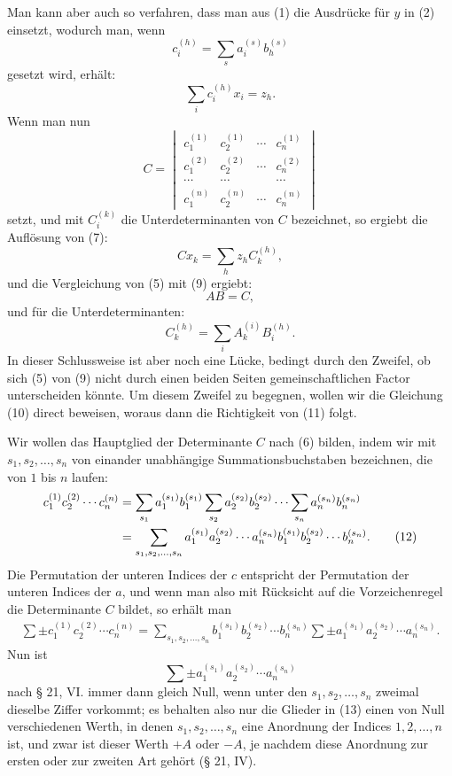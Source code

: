 \documentclass[11pt]{article}
\begin{document}
Man kann aber auch so verfahren, dass man aus (1) die Ausdrücke für $y$ in (2) einsetzt, wodurch man, wenn
\begin{equation}
 c_i^{(h)}=\sum_s a_i^{(s)}b_h^{(s)}\tag{6}
\end{equation}
gesetzt wird, erhält:
\begin{equation}
 \sum_i c_i^{(h)}x_i=z_h.\tag{7}
\end{equation}
Wenn man nun
\[
C=\begin{vmatrix}
 c_1^{(1)}&c_2^{(1)}&\cdots&c_n^{(1)}\\
 c_1^{(2)}&c_2^{(2)}&\cdots&c_n^{(2)}\\
 \cdots&\cdots&&\cdots\\
 c_1^{(n)}&c_2^{(n)}&\cdots&c_n^{(n)}
\end{vmatrix}\tag{8}
\]
setzt, und mit $C_i^{(k)}$ die Unterdeterminanten von $C$ bezeichnet, so ergiebt die Auflösung von (7):
\begin{equation}
 Cx_k=\sum_h z_h C_k^{(h)},\tag{9}
\end{equation}
und die Vergleichung von (5) mit (9) ergiebt:
\begin{equation}
 AB=C,\tag{10}
\end{equation}
und für die Unterdeterminanten:
\begin{equation}
 C_k^{(h)}=\sum_i A_k^{(i)}B_i^{(h)}.\tag{11}
\end{equation}
In dieser Schlussweise ist aber noch eine Lücke, bedingt durch den Zweifel, ob sich (5) von (9) nicht durch einen beiden Seiten gemeinschaftlichen Factor unterscheiden könnte. Um diesem Zweifel zu begegnen, wollen wir die Gleichung (10) direct beweisen, woraus dann die Richtigkeit von (11) folgt.

Wir wollen das Hauptglied der Determinante $C$ nach (6) bilden, indem wir mit $s_1,s_2,\ldots,s_n$ von einander unabhängige Summationsbuchstaben bezeichnen, die von $1$ bis $n$ laufen:
\begin{align}
 c_1^{(1)}c_2^{(2)}\cdots c_n^{(n)}
 &=\sum_{s_1}a_1^{(s_1)}b_1^{(s_1)}
   \sum_{s_2}a_2^{(s_2)}b_2^{(s_2)}\cdots
   \sum_{s_n}a_n^{(s_n)}b_n^{(s_n)}\notag\\
 &=\sum_{s_1,s_2,\ldots,s_n}a_1^{(s_1)}a_2^{(s_2)}\cdots a_n^{(s_n)}
 b_1^{(s_1)}b_2^{(s_2)}\cdots b_n^{(s_n)}.\tag{12}
\end{align}
Die Permutation der unteren Indices der $c$ entspricht der Permutation der unteren Indices der $a$, und wenn man also mit Rücksicht auf die Vorzeichenregel die Determinante $C$ bildet, so erhält man
\begin{align}
 \sum \pm c_1^{(1)}c_2^{(2)}\cdots c_n^{(n)}
 =\sum_{s_1,s_2,\ldots,s_n} b_1^{(s_1)}b_2^{(s_2)}\cdots b_n^{(s_n)}
 \sum\pm a_1^{(s_1)}a_2^{(s_2)}\cdots a_n^{(s_n)}.\tag{13}
\end{align}
Nun ist
\[
\sum\pm a_1^{(s_1)}a_2^{(s_2)}\cdots a_n^{(s_n)}
\]
nach § 21, VI. immer dann gleich Null, wenn unter den $s_1,s_2,\ldots,s_n$ zweimal dieselbe Ziffer vorkommt; es behalten also nur die Glieder in (13) einen von Null verschiedenen Werth, in denen $s_1,s_2,\ldots,s_n$ eine Anordnung der Indices $1,2,\ldots,n$ ist, und zwar ist dieser Werth $+A$ oder $-A$, je nachdem diese Anordnung zur ersten oder zur zweiten Art gehört (§ 21, IV).
\end{document}
